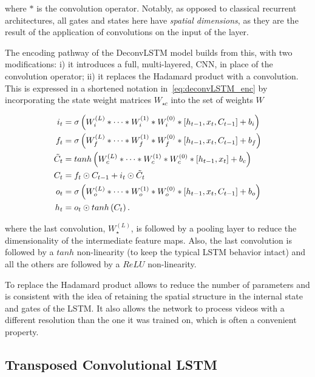 \noindent where $*$ is the convolution operator. Notably, as opposed to
classical recurrent architectures, all gates and states here have \emph{spatial
dimensions}, as they are the result of the application of convolutions on the
input of the layer.

The encoding pathway of the DeconvLSTM model builds from this, with two
modifications: i) it introduces a full, multi-layered, CNN, in place of the
convolution operator; ii) it replaces the Hadamard product with a convolution.
This is expressed in a shortened notation in~\autoref{eq:deconvLSTM_enc} by
incorporating the state weight matrices $W_{\star c}$ into the set of weights
$W$

\begin{equation}\label{eq:deconvLSTM_enc}
\begin{split}
    i_t &= \sigma\left(W_i^{(L)} * \dots * W_i^{(1)} * W_i^{(0)} *
        \left[h_{t-1}, x_t, C_{t-1}\right] + b_i \right)\\
    f_t &= \sigma\left(W_f^{(L)} * \dots * W_f^{(1)} * W_f^{(0)} *
        \left[h_{t-1}, x_t, C_{t-1}\right] + b_f \right)\\
    \tilde C_t &= tanh \left(W_c^{(L)} * \dots * W_c^{(1)} * W_c^{(0)} *
        \left[h_{t-1}, x_t\right] + b_c \right)\\
    C_t &= f_t \odot C_{t-1} + i_t \odot \tilde C_t\\
    o_t &= \sigma\left(W_o^{(L)} * \dots * W_o^{(1)} * W_o^{(0)} *
        \left[h_{t-1}, x_t, C_{t-1}\right] + b_o \right)\\
    h_t &= o_t \odot tanh \left(C_t\right).
\end{split}
\end{equation}

\noindent where the last convolution, $W_\star^{(L)}$, is followed by a pooling
layer to reduce the dimensionality of the intermediate feature maps. Also, the
last convolution is followed by a $tanh$ non-linearity (to keep the typical
LSTM behavior intact) and all the others are followed by a $ReLU$
non-linearity.

To replace the Hadamard product allows to reduce the number of
parameters and is consistent with the idea of retaining the spatial structure
in the internal state and gates of the LSTM. It also allows the network to
process videos with a different resolution than the one it was trained on,
which is often a convenient property.


\subsection{Transposed Convolutional LSTM}


